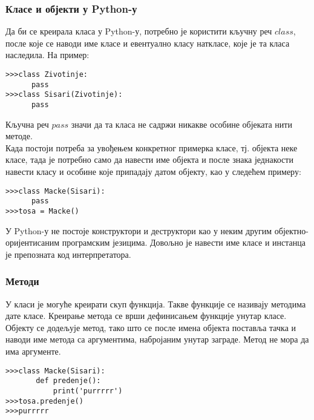 		\subsubsection{Класе и објекти у Python-у}
		Да би се креирала класа у Python-у, потребно је користити кључну реч $class$, после које се наводи име класе и евентуално класу наткласе, које је та класа наследила. На пример:
		\begin{lstlisting}[caption=Дефинисање класа, label=class]
>>>class Zivotinje:
      pass
>>>class Sisari(Zivotinje):
      pass
		\end{lstlisting}
	    Кључна реч $pass$ значи да та класа не садржи никакве особине објеката нити методе.\\
\pagebreak	    
	    Када постоји потреба за увођењем конкретног примерка класе, тј. објекта неке класе, тада је потребно само да навести име објекта и после знака једнакости навести класу и особине које припадају датом објекту, као у следећем примеру: 
	    \begin{lstlisting}[caption=Креирање објекта, label=objects]
>>>class Macke(Sisari):
      pass
>>>tosa = Macke()	    
	    \end{lstlisting}
	    У Python-у не постоје конструктори и деструктори као у неким другим објектно-оријентисаним програмским језицима. Довољно је навести име класе и инстанца је препозната код интерпретатора. 
		\subsubsection{Методи}
		У класи је могуће креирати скуп функција. Такве функције се називају методима дате класе. Креирање метода се врши дефинисањем функције унутар класе.\\
		Објекту се додељује метод, тако што се после имена објекта поставља тачка и наводи име метода са аргументима, набројаним унутар заграде. Метод не мора да има аргументе. 
		\begin{lstlisting}[caption= Методи класе, label=method]
>>>class Macke(Sisari):
       def predenje():
           print('purrrrr')
>>>tosa.predenje()
>>>purrrrr 
		\end{lstlisting} 